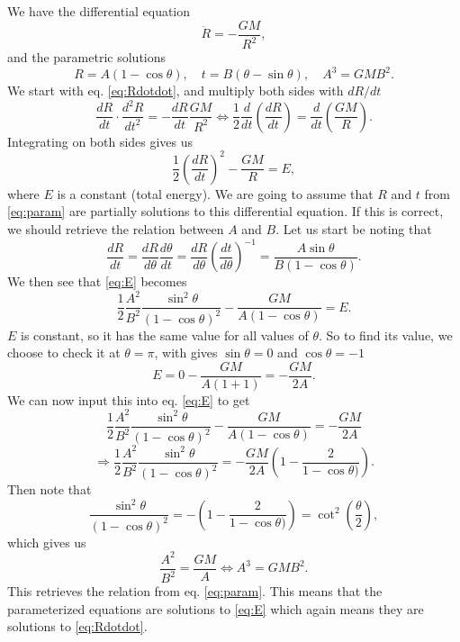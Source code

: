 \documentclass[a4paper,norsk, 10pt]{article}
\begin{document}
We have the differential equation 
\begin{equation}\label{eq:Rdotdot}
\ddot{R} = -\frac{GM}{R^2},
\end{equation}
and the parametric solutions 
\begin{equation}\label{eq:param}
R = A(1-\cos \theta), \quad t = B(\theta - \sin \theta), \quad A^3 = GMB^2.
\end{equation}
We start with eq. \eqref{eq:Rdotdot}, and multiply both sides with $dR/dt$
\begin{equation}
\frac{dR}{dt}\cdot \frac{d^2R}{dt^2} = - \frac{dR}{dt}\frac{GM}{R^2} \Leftrightarrow \frac{1}{2}\frac{d}{dt}\left(\frac{dR}{dt}\right) = \frac{d}{dt}\left(\frac{GM}{R}\right).
\end{equation}
Integrating on both sides gives us
\begin{equation}\label{eq:E}
\frac{1}{2}\left(\frac{dR}{dt}\right)^2 - \frac{GM}{R} = E,
\end{equation}
where $E$ is a constant (total energy). We are going to assume that $R$ and $t$ from \eqref{eq:param} are partially solutions to this differential equation. If this is correct, we should retrieve the relation between $A$ and $B$. Let us start be noting that
\begin{equation}\label{eq:dRdt}
\frac{dR}{dt} = \frac{dR}{d\theta}\frac{d\theta}{dt} = \frac{dR}{d\theta}\left(\frac{dt}{d\theta}\right)^{-1} = \frac{A\sin \theta}{B(1-\cos \theta)}.
\end{equation}
We then see that \eqref{eq:E} becomes
\begin{equation}\label{eq:E_param}
\frac{1}{2}\frac{A^2}{B^2}\frac{\sin^2 \theta}{(1-\cos \theta)^2} - \frac{GM}{A(1-\cos \theta)} = E.
\end{equation}
$E$ is constant, so it has the same value for all values of $\theta$. So to find its value, we choose to check it at $\theta = \pi$, with gives $\sin \theta = 0$ and $\cos \theta = -1$
\begin{equation}
E = 0 - \frac{GM}{A(1+1)} = -\frac{GM}{2A}.
\end{equation}
We can now input this into eq. \eqref{eq:E} to get
\begin{equation}
\frac{1}{2}\frac{A^2}{B^2}\frac{\sin^2 \theta}{(1-\cos \theta)^2} - \frac{GM}{A(1-\cos \theta)} = -\frac{GM}{2A}
\end{equation}
\begin{equation}
\Rightarrow \frac{1}{2}\frac{A^2}{B^2}\frac{\sin^2 \theta}{(1-\cos \theta)^2} = -\frac{GM}{2A}\left(1 - \frac{2}{1-\cos \theta)}\right).
\end{equation}
Then note that
\begin{equation}
\frac{\sin^2 \theta}{(1-\cos \theta)^2} = - \left(1 - \frac{2}{1-\cos \theta)}\right) = \cot^2\left(\frac{\theta}{2}\right),
\end{equation}
which gives us
\begin{equation}
\frac{A^2}{B^2} = \frac{GM}{A} \Leftrightarrow A^3 = GMB^2.
\end{equation}
This retrieves the relation from eq. \eqref{eq:param}. This means that the parameterized equations are solutions to \eqref{eq:E} which again means they are solutions to \eqref{eq:Rdotdot}.
\end{document}
